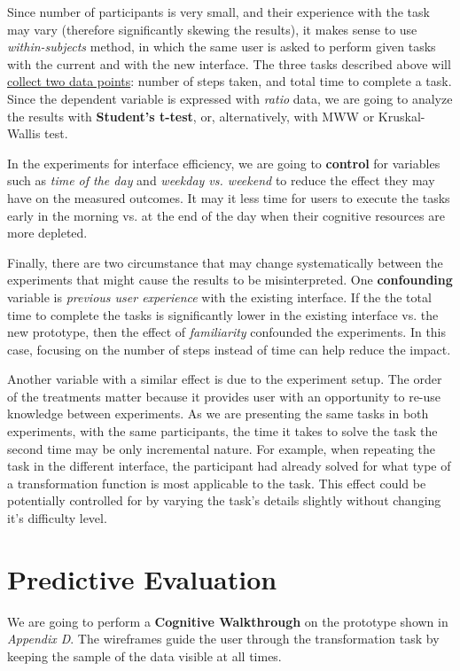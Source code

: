 \documentclass[12pt,letterpaper]{article}
\begin{document}
\bigskip
Since number of participants is very small, and their experience with the task may vary (therefore significantly skewing the results), it makes sense to use \textit{within-subjects} method, in which the same user is asked to perform given tasks with the current and with the new interface. The three tasks described above will \underline{collect two data points}: number of steps taken, and total time to complete a task. Since the dependent variable is expressed with \textit{ratio} data, we are going to analyze the results with \textbf{Student's t-test}, or, alternatively, with MWW or Kruskal-Wallis test. 

In the experiments for interface efficiency, we are going to \textbf{control} for variables such as \textit{time of the day} and \textit{weekday vs. weekend} to reduce the effect they may have on the measured outcomes. It may it less time for users to execute the tasks early in the morning vs. at the end of the day when their cognitive resources are more depleted. 

Finally, there are two circumstance that may change systematically between the experiments that might cause the results to be misinterpreted. One \textbf{confounding} variable is \textit{previous user experience} with the existing interface. If the the total time to complete the tasks is significantly lower in the existing interface vs. the new prototype, then the effect of \textit{familiarity}  confounded the experiments. In this case, focusing on the number of steps instead of time can help reduce the impact.

Another variable with a similar effect is due to the experiment setup. The order of the treatments matter because it provides user with an opportunity to re-use knowledge between experiments. As we are presenting the same tasks in both experiments, with the same participants, the time it takes to solve the task the second time may be only incremental nature. For example, when repeating the task in the different interface, the participant had already solved for what type of a transformation function is most applicable to the task. This effect could be potentially controlled for by varying the task's details slightly without changing it's difficulty level.


\section*{Predictive Evaluation}

We are going to perform a \textbf{Cognitive Walkthrough} on the prototype shown in \textit{Appendix D}. The wireframes guide the user through the transformation task by keeping the sample of the data visible at all times. 
\end{document}

